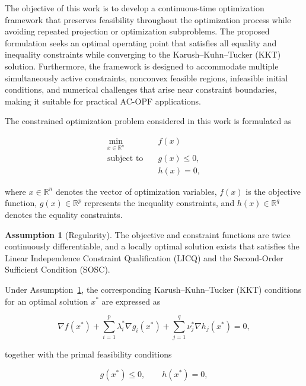 \documentclass[11pt,onecolumn]{article}
\theoremstyle{definition}
\newtheorem{assumption}[theorem]{Assumption}
\theoremstyle{remark}
\begin{document}
The objective of this work is to develop a continuous-time optimization framework that preserves feasibility throughout the optimization process while avoiding repeated projection or optimization subproblems. The proposed formulation seeks an optimal operating point that satisfies all equality and inequality constraints while converging to the Karush--Kuhn--Tucker (KKT) solution. Furthermore, the framework is designed to accommodate multiple simultaneously active constraints, nonconvex feasible regions, infeasible initial conditions, and numerical challenges that arise near constraint boundaries, making it suitable for practical AC-OPF applications.

The constrained optimization problem considered in this work is formulated as

\begin{equation}
\begin{aligned}
\min_{x\in\mathbb{R}^{n}} \quad & f(x) \\
\text{subject to}\quad
& g(x)\le0,\\
& h(x)=0,
\end{aligned}
\label{eq:optimization_problem}
\end{equation}

where $x\in\mathbb{R}^{n}$ denotes the vector of optimization variables, $f(x)$ is the objective function, $g(x)\in\mathbb{R}^{p}$ represents the inequality constraints, and $h(x)\in\mathbb{R}^{q}$ denotes the equality constraints.

\begin{assumption}[Regularity]\label{ass:regularity}
The objective and constraint functions are twice continuously differentiable, and a locally
optimal solution exists that satisfies the Linear Independence Constraint Qualification
(LICQ) and the Second-Order Sufficient Condition (SOSC).
\end{assumption}

Under Assumption~\ref{ass:regularity}, the corresponding Karush--Kuhn--Tucker (KKT) conditions for an optimal solution $x^{*}$ are expressed as

\begin{equation}
\nabla f(x^{*})
+\sum_{i=1}^{p}\lambda_i^{*}\nabla g_i(x^{*})
+\sum_{j=1}^{q}\nu_j^{*}\nabla h_j(x^{*})
=0,
\label{eq:stationarity}
\end{equation}

together with the primal feasibility conditions

\begin{equation}
g(x^{*})\le0,
\qquad
h(x^{*})=0,
\label{eq:primal_feasibility}
\end{equation}
\end{document}
